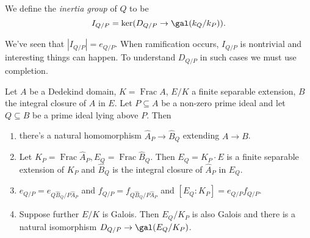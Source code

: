 \documentclass[a4paper]{article}
\DeclareMathOperator{\Frac}{Frac}
\begin{document}
\begin{definition}
  We define the \emph{inertia group} of \(Q\) to be
  \[
    I_{Q/P} = \ker (D_{Q/P} \to \gal(k_Q/k_P)).
  \]
\end{definition}

We've seen that \(|I_{Q/P}| = e_{Q/P}\). When ramification occurs, \(I_{Q/P}\) is nontrivial and interesting things can happen. To understand \(D_{Q/P}\) in such cases we must use completion.

\begin{proposition}
  Let \(A\) be a Dedekind domain, \(K = \Frac A\), \(E/K\) a finite separable extension, \(B\) the integral closure of \(A\) in \(E\). Let \(P \subseteq A\) be a non-zero prime ideal and let \(Q \subseteq B\) be a prime ideal lying above \(P\). Then
  \begin{enumerate}
  \item there's a natural homomorphism \(\hat A_P \to \hat B_Q\) extending \(A \to B\).
  \item Let \(K_P = \Frac \hat A_P, E_Q = \Frac \hat B_Q\). Then \(E_Q = K_P \cdot E\) is a finite separable extension of \(K_P\) and \(\hat B_Q\) is the integral closure of \(\hat A_P\) in \(E_Q\).
  \item \(e_{Q/P} = e_{Q \hat B_Q/P \hat A_P}\) and \(f_{Q/P} = f_{Q \hat B_Q/P \hat A_P}\) and \([E_Q: K_P] = e_{Q/P} f_{Q/P}\).
  \item Suppose further \(E/K\) is Galois. Then \(E_Q/K_P\) is also Galois and there is a natural isomorphism \(D_{Q/P} \to \gal(E_Q/K_P)\).
  \end{enumerate}
\end{proposition}
\end{document}
